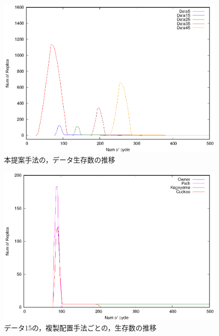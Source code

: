 \documentclass[11pt]{jreport}
\begin{document}
\begin{figure}[H]
	\begin{center}
		\includegraphics[width=15.0cm]{./figure/cuckoo_counter.eps}
	\end{center}
	\caption{本提案手法の，データ生存数の推移}
	\label{fig:cuckoo_c}
\end{figure}

\begin{figure}[H]
	\begin{center}
		\includegraphics[width=15.0cm]{./figure/counter_comp.eps}
	\end{center}
	\caption{データ15の，複製配置手法ごとの，生存数の推移}
	\label{fig:counter_comp}
\end{figure}
\end{document}
